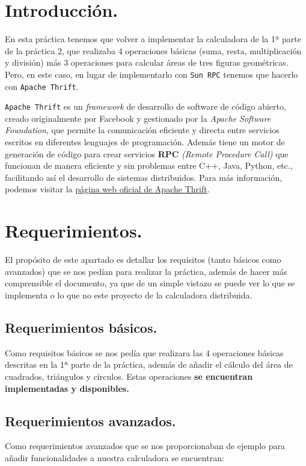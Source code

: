 \documentclass[a4paper,12pt]{article}
\begin{document}
	\tableofcontents
	\newpage %
	
	\section{Introducción.}
		En esta práctica tenemos que volver a implementar la calculadora de la 1ª parte de la práctica 2, que realizaba 4 operaciones básicas (suma, resta, multiplicación y división) más 3 operaciones para calcular áreas de tres figuras geométricas. Pero, en este caso, en lugar de implementarlo con \texttt{Sun RPC} tenemos que hacerlo con \texttt{Apache Thrift}.
		
		\texttt{Apache Thrift} es un \textit{framework} de desarrollo de software de código abierto, creado originalmente por Facebook y gestionado por la \textit{Apache Software Foundation}, que permite la comunicación eficiente y directa entre servicios escritos en diferentes lenguajes de programación. Además tiene un motor de generación de código para crear servicios \textbf{RPC} \textit{(Remote Procedure Call)} que funcionan de manera eficiente y sin problemas entre C++, Java, Python, etc., facilitando así el desarrollo de sistemas distribuidos. Para más información, podemos visitar la  \href{https://thrift.apache.org/}{\underline{página web oficial de Apache Thrift}}.
		
	\section{Requerimientos.}
		El propósito de este apartado es detallar los requisitos (tanto básicos como avanzados) que se nos pedían para realizar la práctica, además de hacer más comprensible el documento, ya que de un simple vistazo se puede ver lo que se implementa o lo que no este proyecto de la calculadora distribuida.
	
		\subsection{Requerimientos básicos.}
			Como requisitos básicos se nos pedía que realizara las 4 operaciones básicas descritas en la 1ª parte de la práctica, además de añadir el cálculo del área de cuadrados, triángulos y círculos. Estas operaciones \textbf{se encuentran implementadas y disponibles.}

		\subsection{Requerimientos avanzados.}	
			Como requerimientos avanzados que se nos proporcionaban de ejemplo para añadir funcionalidades a nuestra calculadora se encuentran:
			
\end{document}
